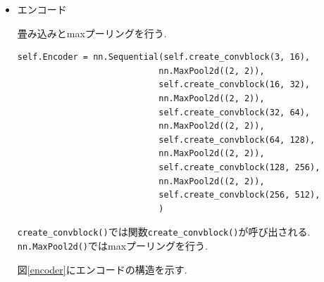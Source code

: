 \documentclass[dvipdfmx]{jsarticle}
\begin{document}
\begin{itemize}
\begin{itemize}
        バッチ正規化

        \item \verb|nn.ReLU()|

        ReLU関数
    \end{itemize}

    
    

    

    \item エンコード

    畳み込みとmaxプーリングを行う.
    \begin{lstlisting}
self.Encoder = nn.Sequential(self.create_convblock(3, 16),     
                            nn.MaxPool2d((2, 2)), 
                            self.create_convblock(16, 32),   
                            nn.MaxPool2d((2, 2)), 
                            self.create_convblock(32, 64),    
                            nn.MaxPool2d((2, 2)), 
                            self.create_convblock(64, 128),   
                            nn.MaxPool2d((2, 2)), 
                            self.create_convblock(128, 256),   
                            nn.MaxPool2d((2, 2)), 
                            self.create_convblock(256, 512),   
                            )
    \end{lstlisting}

    \verb|create_convblock()|では関数\verb|create_convblock()|が呼び出される.
    \verb|nn.MaxPool2d()|ではmaxプーリングを行う.

    図\ref{encoder}にエンコードの構造を示す.

\end{itemize}
\end{document}
